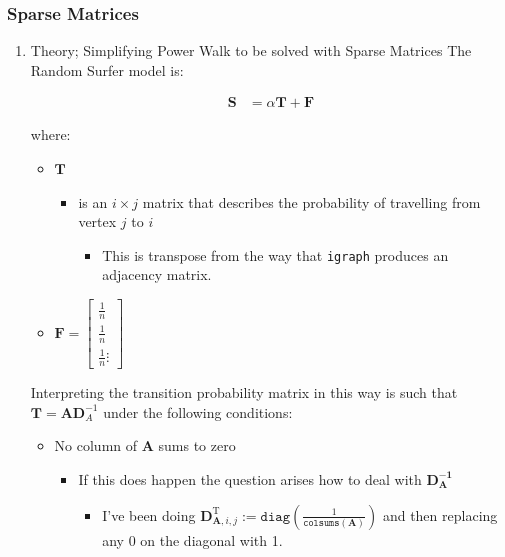 \documentclass[11pt]{article}
\begin{document}
\subsubsection{Sparse Matrices}
\label{sec:orge7ec6a0}
\begin{enumerate}
\item Theory; Simplifying Power Walk to be solved with Sparse Matrices
\label{sec:orge94527f}
The Random Surfer model is:

$$\begin{aligned}
    \mathbf{S} &= \alpha \mathbf{T} +  \mathbf{F}  \label{eq:sparse-RS}\end{aligned}$$

where:

\begin{itemize}
\item \(\mathbf{T}\)

\begin{itemize}
\item is an \(i \times j\) matrix that describes the probability of
travelling from vertex \(j\) to \(i\)

\begin{itemize}
\item This is transpose from the way that \texttt{igraph} produces an adjacency
matrix.
\end{itemize}
\end{itemize}

\item \(\mathbf{F} = \begin{bmatrix} \frac{1}{n} \\ \frac{1}{n} \\ \frac{1}{n} \vdots \end{bmatrix}\)
\end{itemize}

Interpreting the transition probability matrix in this way is such that
\(\mathbf{T}= \mathbf{A}\mathbf{D}^{- 1}_A\) under the following
conditions:


\begin{itemize}
\item No column of \(\mathbf{A}\) sums to zero

\begin{itemize}
\item If this does happen the question arises how to deal with
\(\mathbf{D_\mathbf{A}^{- 1}}\)

\begin{itemize}
\item I've been doing \(\mathbf{D}^{\mathrm{T}}_{\mathbf{A}, i, j} := \mathtt{diag} \left( {\frac{1}{\mathtt{colsums}\left( \mathbf{A} \right)}} \right)\)
and then replacing any \(0\) on the diagonal with 1.
\end{itemize}


\end{itemize}
\end{itemize}
\end{enumerate}
\end{document}
